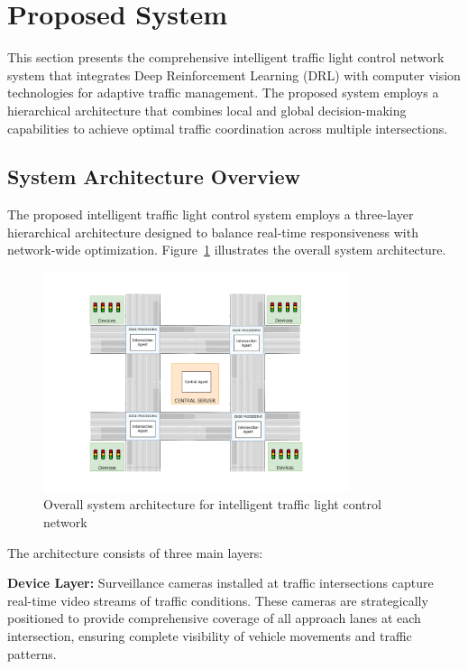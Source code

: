 \section{Proposed System}\label{sec2a}

This section presents the comprehensive intelligent traffic light control network system that integrates Deep Reinforcement Learning (DRL) with computer vision technologies for adaptive traffic management. The proposed system employs a hierarchical architecture that combines local and global decision-making capabilities to achieve optimal traffic coordination across multiple intersections.

\subsection{System Architecture Overview}\label{subsec2a-1}

The proposed intelligent traffic light control system employs a three-layer hierarchical architecture designed to balance real-time responsiveness with network-wide optimization. Figure~\ref{fig:system_overview} illustrates the overall system architecture.

\begin{figure}[!htb]
    \centering
    \includegraphics[width=0.8\textwidth]{figures/ch3_system_overview_architecture.png}
    \caption{Overall system architecture for intelligent traffic light control network}
    \label{fig:system_overview}
\end{figure}

The architecture consists of three main layers:

\textbf{Device Layer:} Surveillance cameras installed at traffic intersections capture real-time video streams of traffic conditions. These cameras are strategically positioned to provide comprehensive coverage of all approach lanes at each intersection, ensuring complete visibility of vehicle movements and traffic patterns.

